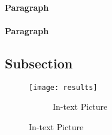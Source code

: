 \lipsum[6] %

\paragraph{Paragraph} \lipsum[7] %
\paragraph{Paragraph} \lipsum[8] %

\subsection{Subsection}

\lipsum[9] %

\begin{figure}[ht]\centering
	\texttt{[image: results]}
        \begin{figure}
	\caption{In-text Picture}
\end{figure}
	\label{fig:results}
\end{figure}